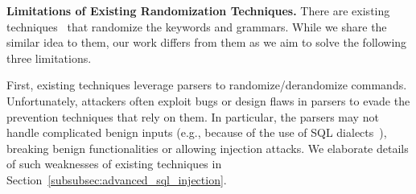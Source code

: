 \noindent
{\bf Limitations of Existing Randomization Techniques.}
There are existing techniques~\cite{sqlrand, autorand, isr2} that randomize the keywords and grammars.
%
While we share the similar idea to them, our work differs from them as we aim to solve the following three limitations.

First, existing techniques leverage parsers to randomize/derandomize commands. Unfortunately, attackers often exploit bugs or design flaws in parsers to evade the prevention techniques that rely on them.
In particular, the parsers may not handle complicated benign inputs (e.g., because of the use of SQL dialects~\cite{sql_dialect}), breaking benign functionalities or allowing injection attacks. We elaborate details of such weaknesses of existing techniques in Section~\ref{subsubsec:advanced_sql_injection}. 
\vspace{-0.3em}

